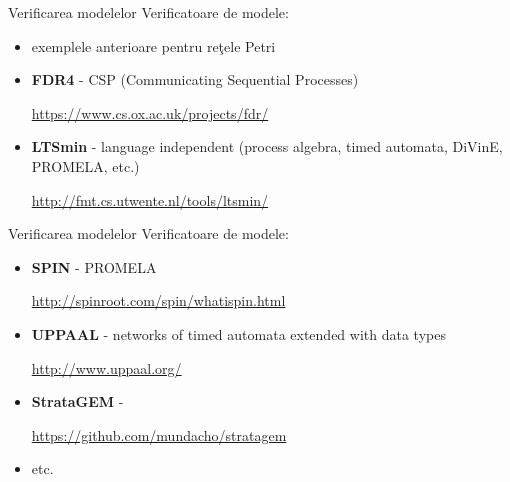 \documentclass{beamer}
\begin{document}
\begin{frame}{Verificarea modelelor}
Verificatoare de modele:
\begin{itemize}
\item
exemplele anterioare pentru reţele Petri
\newline

\item
\textbf{FDR4} - CSP (Communicating Sequential Processes)

\url{https://www.cs.ox.ac.uk/projects/fdr/}
\newline

\item
\textbf{LTSmin} - language independent (process algebra, timed automata, DiVinE, PROMELA, etc.)

\url{http://fmt.cs.utwente.nl/tools/ltsmin/}
\newline
\end{itemize}
\end{frame}



\begin{frame}{Verificarea modelelor}
Verificatoare de modele:
\begin{itemize}
\item
\textbf{SPIN} - PROMELA

\url{http://spinroot.com/spin/whatispin.html}
\newline

\item
\textbf{UPPAAL} - networks of timed automata extended with data types

\url{http://www.uppaal.org/}
\newline

\item
\textbf{StrataGEM} - 

\url{https://github.com/mundacho/stratagem}
\newline
\item
etc.
\end{itemize}
\end{frame}
\end{document}
